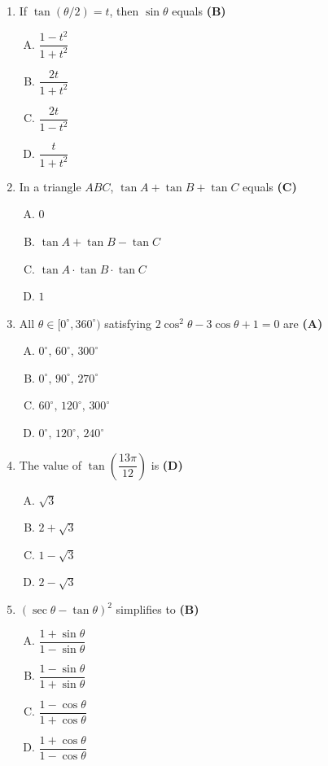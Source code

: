 \documentclass[10pt,a4paper]{article}
\begin{document}
\begin{enumerate}[1.]
\item If $\tan(\theta/2) = t$, then $\sin\theta$ equals \hfill \textbf{(B)}
\begin{enumerate}[(A)]
    \item $\dfrac{1-t^2}{1+t^2}$
    \item $\dfrac{2t}{1+t^2}$
    \item $\dfrac{2t}{1-t^2}$
    \item $\dfrac{t}{1+t^2}$
\end{enumerate}

\item In a triangle $ABC$, $\tan A + \tan B + \tan C$ equals \hfill \textbf{(C)}
\begin{enumerate}[(A)]
    \item $0$
    \item $\tan A + \tan B - \tan C$
    \item $\tan A \cdot \tan B \cdot \tan C$
    \item $1$
\end{enumerate}

\item All $\theta \in [0^\circ, 360^\circ)$ satisfying $2\cos^2\theta - 3\cos\theta + 1 = 0$ are \hfill \textbf{(A)}
\begin{enumerate}[(A)]
    \item $0^\circ,\, 60^\circ,\, 300^\circ$
    \item $0^\circ,\, 90^\circ,\, 270^\circ$
    \item $60^\circ,\, 120^\circ,\, 300^\circ$
    \item $0^\circ,\, 120^\circ,\, 240^\circ$
\end{enumerate}

\item The value of $\tan\!\left(\dfrac{13\pi}{12}\right)$ is \hfill \textbf{(D)}
\begin{enumerate}[(A)]
    \item $\sqrt{3}$
    \item $2+\sqrt{3}$
    \item $1-\sqrt{3}$
    \item $2-\sqrt{3}$
\end{enumerate}

\item $(\sec\theta - \tan\theta)^2$ simplifies to \hfill \textbf{(B)}
\begin{enumerate}[(A)]
    \item $\dfrac{1+\sin\theta}{1-\sin\theta}$
    \item $\dfrac{1-\sin\theta}{1+\sin\theta}$
    \item $\dfrac{1-\cos\theta}{1+\cos\theta}$
    \item $\dfrac{1+\cos\theta}{1-\cos\theta}$
\end{enumerate}


\end{enumerate}
\end{document}
